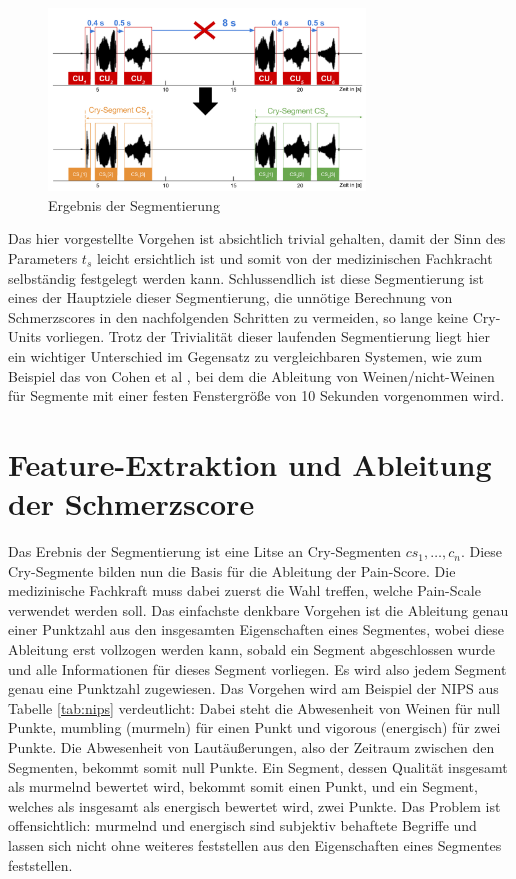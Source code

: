 \begin{figure}[h]
	\centering
	\includegraphics[width=0.75\textwidth]{bilder/segmentierung06.png}
	\caption{Ergebnis der Segmentierung}
	\label{img:segmenting03}
\end{figure}

Das hier vorgestellte Vorgehen ist absichtlich trivial gehalten, damit der Sinn des Parameters $t_{s}$ leicht ersichtlich ist und somit von der medizinischen Fachkracht selbständig festgelegt werden kann. Schlussendlich ist diese Segmentierung ist eines der Hauptziele dieser Segmentierung, die unnötige Berechnung von Schmerzscores in den nachfolgenden Schritten zu vermeiden, so lange keine Cry-Units vorliegen. Trotz der Trivialität dieser laufenden Segmentierung liegt hier ein wichtiger Unterschied im Gegensatz zu vergleichbaren Systemen, wie zum Beispiel das von Cohen et al \cite{cohenCry}, bei dem die Ableitung von Weinen/nicht-Weinen für Segmente mit einer festen Fenstergröße von 10 Sekunden vorgenommen wird. 

\section{Feature-Extraktion und Ableitung der Schmerzscore}
\label{sec:overviewPainRegression}

Das Erebnis der Segmentierung ist eine Litse an Cry-Segmenten $cs_1,  \ldots , c_n$. Diese Cry-Segmente bilden nun die Basis für die Ableitung der Pain-Score. Die medizinische Fachkraft muss dabei zuerst die Wahl treffen, welche Pain-Scale verwendet werden soll. Das einfachste denkbare Vorgehen ist die Ableitung genau einer Punktzahl aus den insgesamten Eigenschaften eines Segmentes, wobei diese Ableitung erst vollzogen werden kann, sobald ein Segment abgeschlossen wurde und alle Informationen für dieses Segment vorliegen. Es wird also jedem Segment genau eine Punktzahl zugewiesen. Das Vorgehen wird am Beispiel der NIPS aus Tabelle \ref{tab:nips} verdeutlicht: Dabei steht die Abwesenheit von Weinen für null Punkte, \glqq mumbling\grqq{} (murmeln) für einen Punkt und \glqq vigorous\grqq{} (energisch) für zwei Punkte. Die Abwesenheit von Lautäußerungen, also der Zeitraum zwischen den Segmenten, bekommt somit null Punkte. Ein Segment, dessen Qualität insgesamt als \glqq murmelnd\grqq{} bewertet wird, bekommt somit einen Punkt, und ein Segment, welches als insgesamt als \glqq energisch\grqq{} bewertet wird, zwei Punkte. Das Problem ist offensichtlich: \glqq murmelnd\grqq{} und \glqq energisch\grqq{} sind subjektiv behaftete Begriffe und lassen sich nicht ohne weiteres feststellen aus den Eigenschaften eines Segmentes feststellen. 

